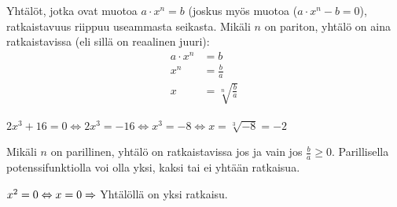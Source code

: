 




Yhtälöt, jotka ovat muotoa $a\cdot x^n = b$ (joskus myös muotoa ($a\cdot x^n - b = 0$), ratkaistavuus riippuu useammasta seikasta. Mikäli $n$ on pariton, yhtälö on aina ratkaistavissa (eli sillä on reaalinen juuri):
\begin{align*}
a\cdot x^n &= b \\
x^n &= \frac{b}{a} \\
x &= \sqrt[n]{\frac{b}{a}}
\end{align*}

\begin{esimerkki}
$2x^3 + 16 = 0 \Leftrightarrow 2x^3 = -16 \Leftrightarrow x^3 = -8  \Leftrightarrow x = \sqrt[3]{-8} = -2 $
\end{esimerkki}

Mikäli $n$ on parillinen, yhtälö on ratkaistavissa jos ja vain jos $\frac{b}{a} \geq 0 $. Parillisella potenssifunktiolla voi olla yksi, kaksi tai ei yhtään ratkaisua.

\begin{esimerkki}
$x^2 = 0 \Leftrightarrow x = 0 \\
\Rightarrow$ Yhtälöllä on yksi ratkaisu.
\end{esimerkki}

